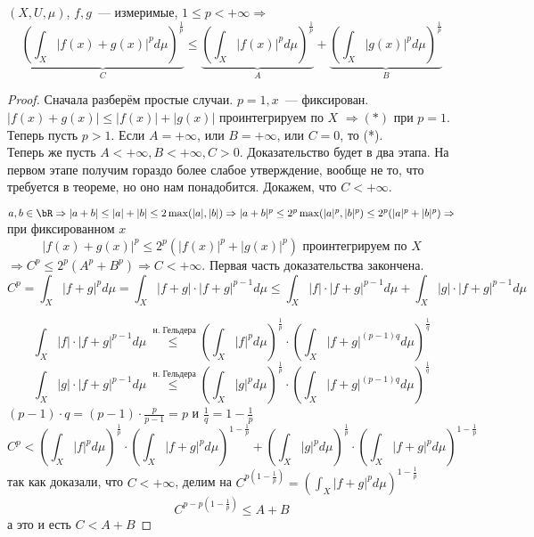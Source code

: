 \documentclass[document]{subfiles}
\begin{document}
\begin{theorem}
    $(X, U, \mu)$, $f, g$~--- измеримые, $1 \leq p < + \infty \Rightarrow$
    \[ \underbrace{\left( \int_X |f(x) + g(x)|^p d \mu \right)^{\frac{1}{p}}}_{C}  \leq \underbrace{\left( \int_X |f(x)|^p d \mu \right)^{\frac{1}{p}}}_{A} + 
    \underbrace{\left( \int_X |g(x)|^p d \mu \right)^{\frac{1}{p}}}_{B} \tag{*} \]
    
\end{theorem}
\begin{proof}
    Сначала разберём простые случаи. $p = 1, x$~--- фиксирован. $|f(x) + g(x)| \leq |f(x)| + |g(x)|$ проинтегрируем по $X$ $\Rightarrow (*)$ при $p = 1$.
    Теперь пусть $p > 1$. Если $A = +\infty$, или $B = +\infty$, или $C = 0$, то (*). \\
    Теперь же пусть $A < +\infty, B < +\infty, C > 0$. 
    Доказательство будет в два этапа. На первом этапе получим гораздо более слабое утверждение, вообще не то, что требуется в теореме, но оно нам понадобится.
    Докажем, что $C < + \infty$.
    
    $a,b \in \bR \Rightarrow |a+b| \leq |a| + |b| \leq 2 \max(|a|, |b|) \Rightarrow |a+b|^p \leq 2^p \max(|a|^p, |b|^p) \leq 2^p(|a|^p + |b|^p) \Rightarrow$
    при фиксированном $x$ 
    \[ |f(x) + g(x) |^p \leq 2^p (|f(x)|^p + |g(x)|^p) \text{ проинтегрируем по } X \]
    $\Rightarrow C^p \leq 2^p(A^p + B^p) \Rightarrow C < + \infty$.
    Первая часть доказательства закончена. \\
    \[ C^p = \int_X |f+g|^p d \mu = \int_X |f+g| \cdot |f + g|^{p-1} d \mu \leq \int_X |f| \cdot |f+g|^{p-1} d\mu + \int_X |g| \cdot |f+g|^{p-1} d \mu \]

    \[ \int_X |f| \cdot |f+g|^{p-1} d\mu \stackrel{\text{ н. Гельдера}}{\leq} \left( \int_X |f|^p d\mu \right)^{\frac{1}{p}} \cdot \left( \int_X |f+g|^{(p-1)q} d\mu \right)^{\frac{1}{q}} \]
    \[ \int_X |g| \cdot |f+g|^{p-1} d\mu \stackrel{\text{ н. Гельдера}}{\leq} \left( \int_X |g|^p d\mu \right)^{\frac{1}{p}} \cdot \left( \int_X |f+g|^{(p-1)q} d\mu \right)^{\frac{1}{q}} \]
    $(p-1) \cdot q = (p-1) \cdot \frac{p}{p-1} = p$ и $\frac{1}{q} = 1 - \frac{1}{p}$
    \[ C^p <  \left( \int_X |f|^p d\mu \right)^{\frac{1}{p}} \cdot \left( \int_X |f+g|^{p} d\mu \right)^{1 - \frac{1}{p}} + \left( \int_X |g|^p d\mu \right)^{\frac{1}{p}} \cdot \left( \int_X |f+g|^{p} d\mu \right)^{1 - \frac{1}{p}} \]
    так как доказали, что $C < +\infty$, делим на $C^{p\left(1-\frac{1}{p}\right)} = \left( \int_X |f+g|^{p} d\mu \right)^{1 - \frac{1}{p}}$
    \[ C^{p-p\left(1-\frac{1}{p}\right)} \leq A + B \] 
    а это и есть $C < A + B$
\end{proof}
\end{document}
